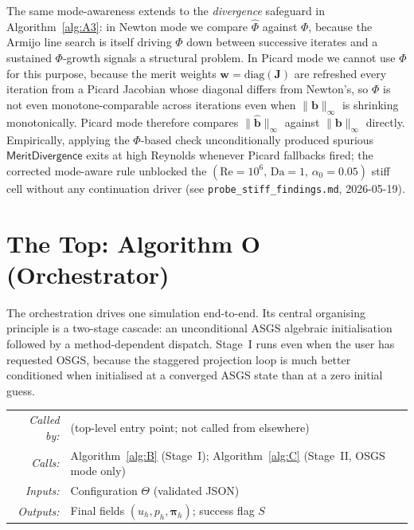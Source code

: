 \documentclass{article}
\makeatletter
\newcommand{\code}[1]{\texttt{\small #1}}
\newcommand{\moduleinterface}[4]{%
\begin{interfacecard}
\footnotesize
\begin{tabular}{@{}r@{\quad}p{0.82\textwidth}@{}}
\textit{Called by:} & #1 \\
\textit{Calls:}     & #2 \\
\textit{Inputs:}    & #3 \\
\textit{Outputs:}   & #4 \\
\end{tabular}
\end{interfacecard}
}
\makeatother
\begin{document}
The same mode-awareness extends to the \emph{divergence} safeguard in
Algorithm~\ref{alg:A3}: in Newton mode we compare $\hat\Phi$ against
$\Phi$, because the Armijo line search is itself driving $\Phi$ down
between successive iterates and a sustained $\Phi$-growth signals a
structural problem. In Picard mode we cannot use $\Phi$ for this purpose,
because the merit weights $\boldsymbol{w} = \mathrm{diag}(\mathbf{J})$ are
refreshed every iteration from a Picard Jacobian whose diagonal differs
from Newton's, so $\Phi$ is not even monotone-comparable across iterations
even when $\|\boldsymbol{b}\|_\infty$ is shrinking monotonically. Picard
mode therefore compares $\|\hat{\boldsymbol{b}}\|_\infty$ against
$\|\boldsymbol{b}\|_\infty$ directly. Empirically, applying the
$\Phi$-based check unconditionally produced spurious
$\mathsf{MeritDivergence}$ exits at high Reynolds whenever Picard
fallbacks fired; the corrected mode-aware rule unblocked the
$(\mathrm{Re} = 10^6,\, \mathrm{Da} = 1,\, \alpha_0 = 0.05)$ stiff cell
without any continuation driver (see \code{probe\_stiff\_findings.md},
2026-05-19).

\section{The Top: Algorithm O (Orchestrator)}
\label{sec:orchestration}

The orchestration drives one simulation end-to-end. Its central
organising principle is a two-stage cascade: an unconditional ASGS
algebraic initialisation followed by a method-dependent dispatch.
Stage~I runs even when the user has requested OSGS, because the
staggered projection loop is much better conditioned when initialised
at a converged ASGS state than at a zero initial guess.

\moduleinterface
    {(top-level entry point; not called from elsewhere)}
    {Algorithm~\ref{alg:B} (Stage~I); Algorithm~\ref{alg:C} (Stage~II, OSGS mode only)}
    {Configuration $\Theta$ (validated JSON)}
    {Final fields $(u_h, p_h, \boldsymbol{\pi}_h)$; success flag $S$}
\end{document}
